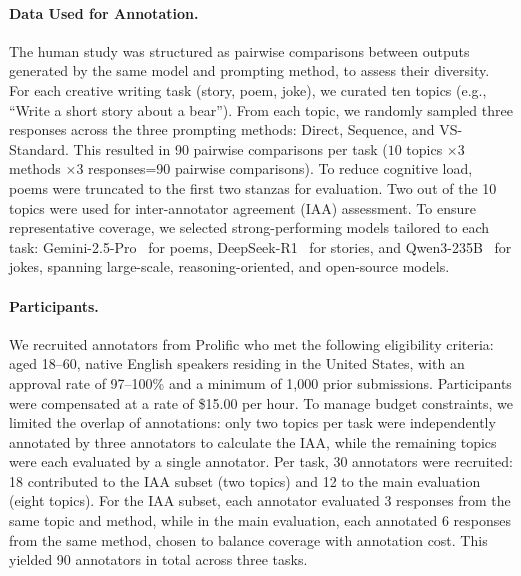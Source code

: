 \paragraph{Data Used for Annotation.}
The human study was structured as pairwise comparisons between outputs generated by the same model and prompting method, to assess their diversity. 
For each creative writing task (story, poem, joke), we curated ten topics (e.g., ``Write a short story about a bear''). 
From each topic, we randomly sampled three responses across the three prompting methods: Direct, Sequence, and VS-Standard. 
This resulted in 90 pairwise comparisons per task ($10$ topics $\times 3$ methods $\times 3$ responses=$90$ pairwise comparisons). To reduce cognitive load, poems were truncated to the first two stanzas for evaluation. 
Two out of the 10 topics were used for inter-annotator agreement (IAA) assessment.
To ensure representative coverage, we selected strong-performing models tailored to each task: Gemini-2.5-Pro~\citep{comanici2025gemini25pushingfrontier} for poems, DeepSeek-R1~\citep{deepseekai2025deepseekr1incentivizingreasoningcapability} for stories, and Qwen3-235B~\citep{yang2025qwen3technicalreport} for jokes, spanning large-scale, reasoning-oriented, and open-source models.

\paragraph{Participants.} 
We recruited annotators from Prolific who met the following eligibility criteria: aged 18–60, native English speakers residing in the United States, with an approval rate of 97–100\% and a minimum of 1,000 prior submissions. Participants were compensated at a rate of \$15.00 per hour. 
To manage budget constraints, we limited the overlap of annotations: only two topics per task were independently annotated by three annotators to calculate the IAA, while the remaining topics were each evaluated by a single annotator.
Per task, 30 annotators were recruited: 18 contributed to the IAA subset (two topics) and 12 to the main evaluation (eight topics). 
For the IAA subset, each annotator evaluated 3 responses from the same topic and method, while in the main evaluation, each annotated 6 responses from the same method, chosen to balance coverage with annotation cost.
This yielded 90 annotators in total across three tasks.

